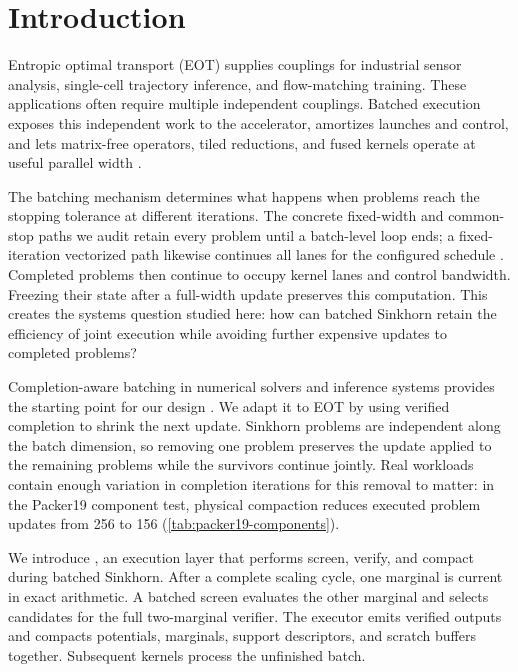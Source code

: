 \section{Introduction}
\label{sec:introduction}

Entropic optimal transport (EOT) supplies couplings for industrial sensor analysis, single-cell trajectory inference, and flow-matching training. These applications often require multiple independent couplings. Batched execution exposes this independent work to the accelerator, amortizes launches and control, and lets matrix-free operators, tiled reductions, and fused kernels operate at useful parallel width \citep{feydy2019sinkhorn,cuturi2022ott,ye2026flashsinkhorn}.

The batching mechanism determines what happens when problems reach the stopping tolerance at different iterations. The concrete fixed-width and common-stop paths we audit retain every problem until a batch-level loop ends; a fixed-iteration vectorized path likewise continues all lanes for the configured schedule \citep{pot2026batchsource,ott2026batching,logsinkhorngpu2024}. Completed problems then continue to occupy kernel lanes and control bandwidth. Freezing their state after a full-width update preserves this computation. This creates the systems question studied here: how can batched Sinkhorn retain the efficiency of joint execution while avoiding further expensive updates to completed problems?

Completion-aware batching in numerical solvers and inference systems provides the starting point for our design \citep{ginkgoBatched,yu2022orca,viljoen2026jaxipm}. We adapt it to EOT by using verified completion to shrink the next update. Sinkhorn problems are independent along the batch dimension, so removing one problem preserves the update applied to the remaining problems while the survivors continue jointly. Real workloads contain enough variation in completion iterations for this removal to matter: in the Packer19 component test, physical compaction reduces executed problem updates from 256 to 156 (\cref{tab:packer19-components}).

We introduce \policy{}, an execution layer that performs screen, verify, and compact during batched Sinkhorn. After a complete scaling cycle, one marginal is current in exact arithmetic. A batched screen evaluates the other marginal and selects candidates for the full two-marginal verifier. The executor emits verified outputs and compacts potentials, marginals, support descriptors, and scratch buffers together. Subsequent kernels process the unfinished batch.


